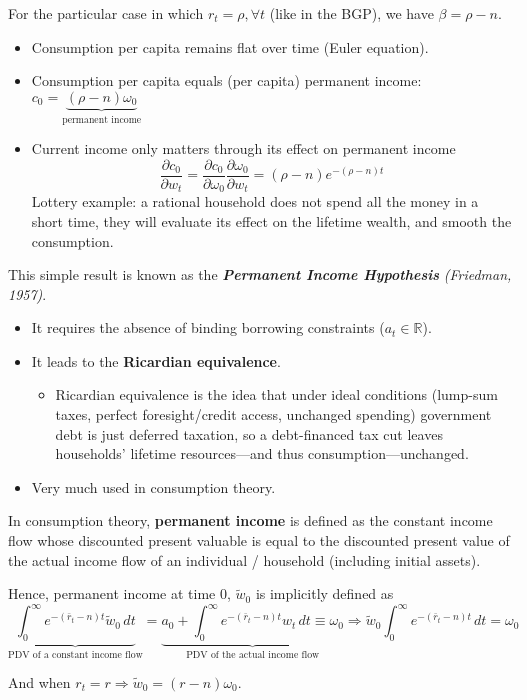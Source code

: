 For the particular case in which $r_t = \rho, \forall t$ (like in the BGP), we have $\beta = \rho - n$.
\begin{itemize}
    \item Consumption per capita remains flat over time (Euler equation).
    \item Consumption per capita equals (per capita) permanent income: $c_0 = \underbrace{(\rho-n)\omega_0}_{\text{permanent income}}$
    \item Current income only matters through its effect on permanent income \[
              \frac{\partial c_0}{\partial w_t} = \frac{\partial c_0}{\partial \omega_0}\frac{\partial \omega_0}{\partial w_t} = (\rho - n)e^{-(\rho-n)t}
          \] Lottery example:  a rational household does not spend all the money in a short time, they will evaluate its effect on the lifetime wealth, and smooth the consumption.
\end{itemize}

This  simple result is known as the \textbf{\textit{Permanent Income Hypothesis}} \textit{(Friedman, 1957)}. \begin{itemize}
    \item It requires the absence of binding borrowing constraints ($a_t \in \mathbb{R}$).
    \item It leads to the \textbf{Ricardian equivalence}. \begin{itemize}
              \item Ricardian equivalence is the idea that under ideal conditions (lump-sum taxes, perfect foresight/credit access, unchanged spending) government debt is just deferred taxation, so a debt-financed tax cut leaves households’ lifetime resources—and thus consumption—unchanged.
          \end{itemize}
    \item Very much used in consumption theory.
\end{itemize}

In consumption theory, \textbf{permanent income} is defined as the constant income flow whose discounted present valuable is equal to the discounted present value of the actual income flow of an individual / household (including initial assets).

Hence, permanent income at time $0$, $\tilde{w}_0$ is implicitly defined as
\[
    \underbrace{\int_{0}^{\infty } e^{-(\bar{r}_t - n)t}\tilde{w}_0 \, dt}_{\text{PDV of a constant income flow}} = \underbrace{a_0 + \int_{0}^{\infty } e^{-(\bar{r}_t - n)t}w_t \, dt \equiv \omega_0}_{\text{PDV of the actual income flow}} \Longrightarrow \tilde{w}_0 \int_{0}^{\infty } e^{-(\bar{r}_t-n)t} \, dt = \omega_0
\]

And when $r_t = r \Rightarrow \tilde{w}_0 = (r-n)\omega_0$.

